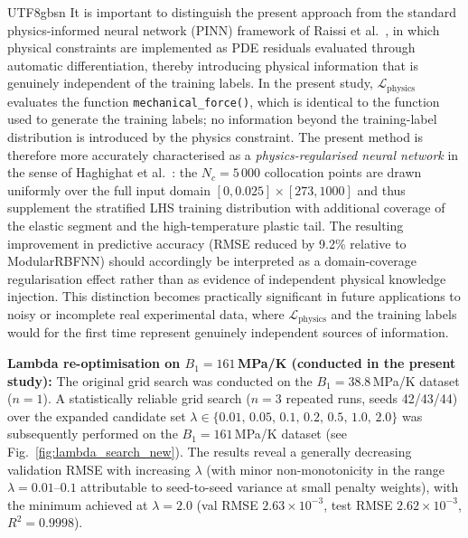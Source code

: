 \documentclass[a4paper,12pt]{report}
\newcommand{\Lphys}{\mathcal{L}_{\text{physics}}}
\begin{document}
\begin{CJK}{UTF8}{gbsn}
It is important to distinguish the present approach from the standard
physics-informed neural network (PINN) framework of Raissi et al.~\cite{raissi2019},
in which physical constraints are implemented as PDE residuals evaluated through
automatic differentiation, thereby introducing physical information that is genuinely
independent of the training labels. In the present study, $\Lphys$ evaluates the
function \texttt{mechanical\_force()}, which is identical to the function used to
generate the training labels; no information beyond the training-label distribution
is introduced by the physics constraint. The present method is therefore more accurately
characterised as a \emph{physics-regularised neural network} in the sense of
Haghighat et al.~\cite{haghighat2021physics}: the $N_c = 5\,000$ collocation points
are drawn uniformly over the full input domain $[0,0.025]\times[273,1000]$ and thus
supplement the stratified LHS training distribution with additional coverage of the
elastic segment and the high-temperature plastic tail. The resulting improvement in
predictive accuracy (RMSE reduced by 9.2\% relative to ModularRBFNN) should accordingly
be interpreted as a domain-coverage regularisation effect rather than as evidence of
independent physical knowledge injection. This distinction becomes practically
significant in future applications to noisy or incomplete real experimental data,
where $\Lphys$ and the training labels would for the first time represent genuinely
independent sources of information.

\textbf{Lambda re-optimisation on $B_1 = 161$\,MPa/K (conducted in the present study):}
The original grid search was conducted on the $B_1 = 38.8$\,MPa/K dataset ($n=1$).
A statistically reliable grid search ($n = 3$ repeated runs, seeds 42/43/44) over the
expanded candidate set $\lambda \in \{0.01,\,0.05,\,0.1,\,0.2,\,0.5,\,1.0,\,2.0\}$
was subsequently performed on the $B_1 = 161$\,MPa/K dataset
(see Fig.~\ref{fig:lambda_search_new}). The results reveal a generally decreasing
validation RMSE with increasing $\lambda$ (with minor non-monotonicity in the range
$\lambda = 0.01$--$0.1$ attributable to seed-to-seed variance at small penalty weights),
with the minimum achieved at $\lambda = 2.0$ (val RMSE $2.63 \times 10^{-3}$, test RMSE
$2.62 \times 10^{-3}$, $R^2 = 0.9998$).


\end{CJK}
\end{document}

